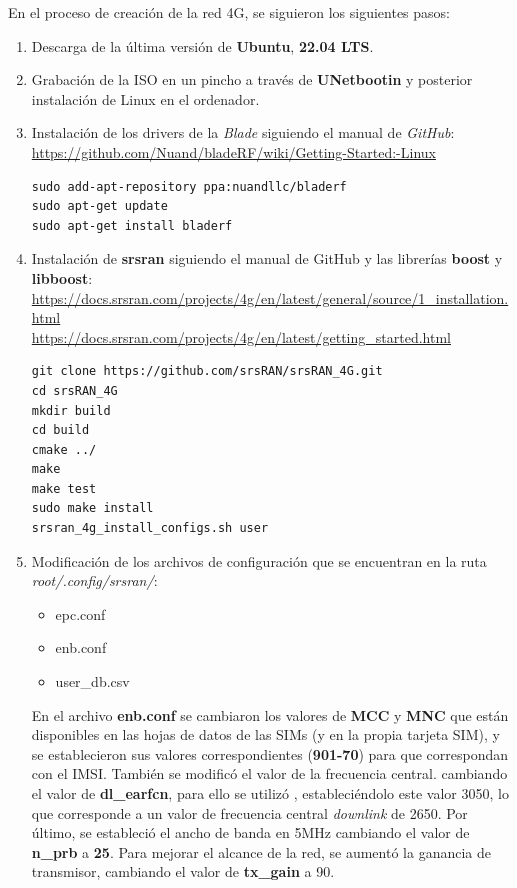 En el proceso de creación de la red 4G, se siguieron los siguientes pasos:

\begin{enumerate}
\item Descarga de la última versión de \textbf{Ubuntu}, \textbf{22.04 LTS}.
\item Grabación de la ISO en un pincho a través de \textbf{UNetbootin} y posterior instalación de Linux en el ordenador.
\item Instalación de los drivers de la \textit{Blade} siguiendo el manual de \textit{GitHub}:\\
 \url{https://github.com/Nuand/bladeRF/wiki/Getting-Started:-Linux}

\begin{lstlisting}
sudo add-apt-repository ppa:nuandllc/bladerf
sudo apt-get update
sudo apt-get install bladerf
\end{lstlisting}

\item Instalación de \textbf{srsran} siguiendo el manual de GitHub y las librerías \textbf{boost} y \textbf{libboost}:\\
\url{https://docs.srsran.com/projects/4g/en/latest/general/source/1_installation.html}\\
\url{https://docs.srsran.com/projects/4g/en/latest/getting_started.html}

\begin{lstlisting}
git clone https://github.com/srsRAN/srsRAN_4G.git
cd srsRAN_4G
mkdir build
cd build
cmake ../
make
make test
sudo make install
srsran_4g_install_configs.sh user
\end{lstlisting}

\item Modificación de los archivos de configuración que se encuentran en la ruta \textit{root/.config/srsran/}:
\begin{itemize}
	\item epc.conf
	\item enb.conf
	\item user_db.csv
\end{itemize}

En el archivo \textbf{enb.conf} se cambiaron los valores de \textbf{MCC} y \textbf{MNC} que están disponibles en las hojas de datos de las SIMs (y en la propia tarjeta SIM), y se establecieron sus valores correspondientes (\textbf{901-70}) para que correspondan con el IMSI. También se modificó el valor de la frecuencia central. cambiando el valor de \textbf{dl_earfcn}, para ello se utilizó \cite{earn}, estableciéndolo este valor 3050, lo que corresponde a un valor de frecuencia central \textit{downlink} de 2650.  Por último, se estableció el ancho de banda en 5MHz cambiando el valor de \textbf{n_prb} a \textbf{25}. Para mejorar el alcance de la red, se aumentó la ganancia de transmisor, cambiando el valor de \textbf{tx_gain} a 90.


\end{enumerate}
